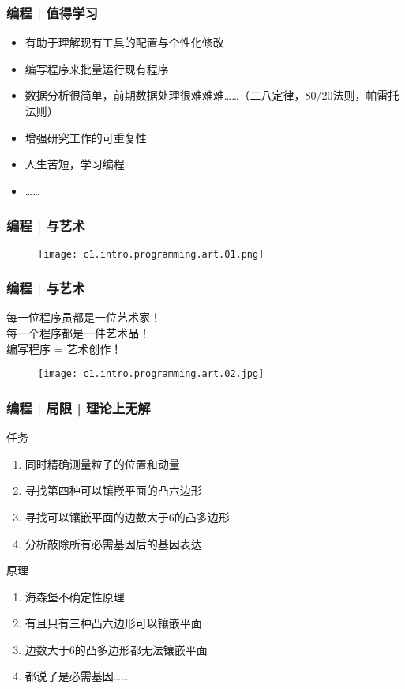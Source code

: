 \begin{frame}
  \frametitle{编程 | 值得学习}
  \begin{itemize}
    \item 有助于理解现有工具的配置与个性化修改
    \item 编写程序来批量运行现有程序
    \item
      数据分析很简单，前期数据处理很难难难……（二八定律，80/20法则，帕雷托法则）
    \item 增强研究工作的可重复性
    \item 人生苦短，学习编程
    \item ……
  \end{itemize}
\end{frame}

\begin{frame}
  \frametitle{编程 | 与艺术}
  \begin{figure}
    \centering
    \texttt{[image: c1.intro.programming.art.01.png]}
  \end{figure}
\end{frame}

\begin{frame}
  \frametitle{编程 | 与艺术}
  \begin{center}
    \large{每一位程序员都是一位艺术家！\\
    每一个程序都是一件艺术品！\\
    编写程序 = 艺术创作！}
\end{center}
\vspace{-1em}
  \begin{figure}
    \centering
    \texttt{[image: c1.intro.programming.art.02.jpg]}
  \end{figure}
\end{frame}

\begin{frame}
  \frametitle{编程 | 局限 | 理论上无解}
  \begin{block}{任务}
    \begin{enumerate}
      \item<1-> 同时精确测量粒子的位置和动量
      \item<2-> 寻找第四种可以镶嵌平面的凸六边形
      \item<3-> 寻找可以镶嵌平面的边数大于6的凸多边形
      \item<4-> 分析敲除所有必需基因后的基因表达
    \end{enumerate}
  \end{block}
  \begin{block}{原理}
    \begin{enumerate}
      \item<1-> 海森堡不确定性原理
      \item<2-> 有且只有三种凸六边形可以镶嵌平面
      \item<3-> 边数大于6的凸多边形都无法镶嵌平面
      \item<4-> 都说了是必需基因……
    \end{enumerate}
  \end{block}
\end{frame}

